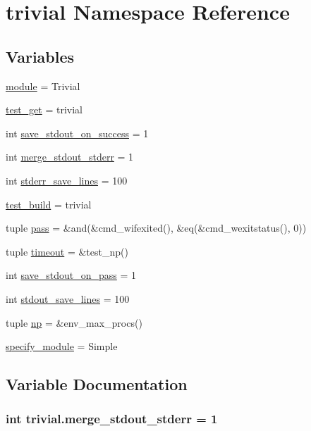 \hypertarget{namespacetrivial}{\section{trivial Namespace Reference}
\label{namespacetrivial}
}
\subsection*{Variables}
\begin{DoxyCompactItemize}
\item 
\hyperlink{namespacetrivial_a3e713ea5d6e77bf165eeaafc02275430}{module} = Trivial
\item 
\hyperlink{namespacetrivial_afe75cace659f04749ee3f7c818152b7b}{test\-\_\-get} = trivial
\item 
int \hyperlink{namespacetrivial_af272dc5ab194f706f77eeb74de7b8c97}{save\-\_\-stdout\-\_\-on\-\_\-success} = 1
\item 
int \hyperlink{namespacetrivial_a8c1d5357654e053cf4d0b8a7f48ff13b}{merge\-\_\-stdout\-\_\-stderr} = 1
\item 
int \hyperlink{namespacetrivial_af6ee4456e84c354e7845aae7ea24d022}{stderr\-\_\-save\-\_\-lines} = 100
\item 
\hyperlink{namespacetrivial_aa612b0f8daffd666959f885b6ba54cd0}{test\-\_\-build} = trivial
\item 
tuple \hyperlink{namespacetrivial_a65b4003f52ce4fa5d324695f54c1e3b3}{pass} = \&and(\&cmd\-\_\-wifexited(), \&eq(\&cmd\-\_\-wexitstatus(), 0))
\item 
tuple \hyperlink{namespacetrivial_a8ce5c7e487f1c21edda391cc47830f5e}{timeout} = \&test\-\_\-np()
\item 
int \hyperlink{namespacetrivial_aefbe39eb9fcb8a58d4e04dd980e35062}{save\-\_\-stdout\-\_\-on\-\_\-pass} = 1
\item 
int \hyperlink{namespacetrivial_aee208868790b8c2d6d9f48ad238aa6c5}{stdout\-\_\-save\-\_\-lines} = 100
\item 
tuple \hyperlink{namespacetrivial_adfe4da0e2d8f3078b198c0f76ee394dd}{np} = \&env\-\_\-max\-\_\-procs()
\item 
\hyperlink{namespacetrivial_af5dae1522345f303cfb4527587cd5361}{specify\-\_\-module} = Simple
\end{DoxyCompactItemize}


\subsection{Variable Documentation}
\hypertarget{namespacetrivial_a8c1d5357654e053cf4d0b8a7f48ff13b}{
\subsubsection[{merge\-\_\-stdout\-\_\-stderr}]{\setlength{\rightskip}{0pt plus 5cm}int trivial.\-merge\-\_\-stdout\-\_\-stderr = 1}}\label{namespacetrivial_a8c1d5357654e053cf4d0b8a7f48ff13b}


